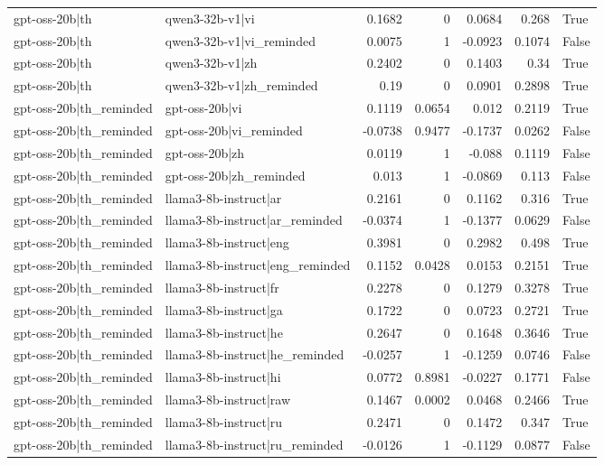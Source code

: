 \begin{table}
\begin{tabular}{l l r r r r l}
gpt-oss-20b|th & qwen3-32b-v1|vi & 0.1682 & 0 & 0.0684 & 0.268 & True \\
gpt-oss-20b|th & qwen3-32b-v1|vi_reminded & 0.0075 & 1 & -0.0923 & 0.1074 & False \\
gpt-oss-20b|th & qwen3-32b-v1|zh & 0.2402 & 0 & 0.1403 & 0.34 & True \\
gpt-oss-20b|th & qwen3-32b-v1|zh_reminded & 0.19 & 0 & 0.0901 & 0.2898 & True \\
gpt-oss-20b|th_reminded & gpt-oss-20b|vi & 0.1119 & 0.0654 & 0.012 & 0.2119 & True \\
gpt-oss-20b|th_reminded & gpt-oss-20b|vi_reminded & -0.0738 & 0.9477 & -0.1737 & 0.0262 & False \\
gpt-oss-20b|th_reminded & gpt-oss-20b|zh & 0.0119 & 1 & -0.088 & 0.1119 & False \\
gpt-oss-20b|th_reminded & gpt-oss-20b|zh_reminded & 0.013 & 1 & -0.0869 & 0.113 & False \\
gpt-oss-20b|th_reminded & llama3-8b-instruct|ar & 0.2161 & 0 & 0.1162 & 0.316 & True \\
gpt-oss-20b|th_reminded & llama3-8b-instruct|ar_reminded & -0.0374 & 1 & -0.1377 & 0.0629 & False \\
gpt-oss-20b|th_reminded & llama3-8b-instruct|eng & 0.3981 & 0 & 0.2982 & 0.498 & True \\
gpt-oss-20b|th_reminded & llama3-8b-instruct|eng_reminded & 0.1152 & 0.0428 & 0.0153 & 0.2151 & True \\
gpt-oss-20b|th_reminded & llama3-8b-instruct|fr & 0.2278 & 0 & 0.1279 & 0.3278 & True \\
gpt-oss-20b|th_reminded & llama3-8b-instruct|ga & 0.1722 & 0 & 0.0723 & 0.2721 & True \\
gpt-oss-20b|th_reminded & llama3-8b-instruct|he & 0.2647 & 0 & 0.1648 & 0.3646 & True \\
gpt-oss-20b|th_reminded & llama3-8b-instruct|he_reminded & -0.0257 & 1 & -0.1259 & 0.0746 & False \\
gpt-oss-20b|th_reminded & llama3-8b-instruct|hi & 0.0772 & 0.8981 & -0.0227 & 0.1771 & False \\
gpt-oss-20b|th_reminded & llama3-8b-instruct|raw & 0.1467 & 0.0002 & 0.0468 & 0.2466 & True \\
gpt-oss-20b|th_reminded & llama3-8b-instruct|ru & 0.2471 & 0 & 0.1472 & 0.347 & True \\
gpt-oss-20b|th_reminded & llama3-8b-instruct|ru_reminded & -0.0126 & 1 & -0.1129 & 0.0877 & False \\

\end{tabular}
\end{table}
